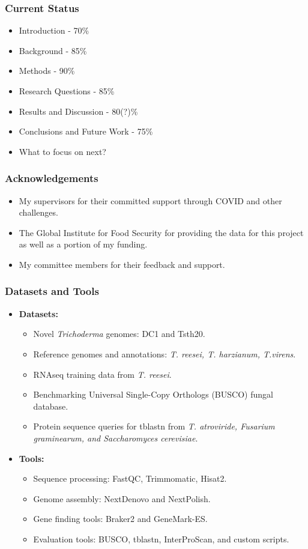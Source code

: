 \documentclass[t]{beamer}
\begin{document}
\begin{frame}
	\frametitle{Current Status}
	\begin{itemize}
		\item Introduction - 70\%
		\item Background - 85\%
		\item Methods - 90\%
		\item Research Questions - 85\%
		\item Results and Discussion - 80(?)\%
		\item Conclusions and Future Work - 75\%
		\item What to focus on next?
	\end{itemize}
\end{frame}

\begin{frame}
	\frametitle{Acknowledgements}
	\begin{itemize}
		\item My supervisors for their committed support through COVID and other challenges.
		\item The Global Institute for Food Security for providing the data for this project as well as a portion of my funding.
		\item My committee members for their feedback and support.
	\end{itemize}
\end{frame}

\begin{frame}
	\frametitle{Datasets and Tools}
	\begin{itemize}
		\item \textbf{Datasets:}
		\begin{itemize}
			\item Novel \textit{Trichoderma} genomes: DC1 and Tsth20.
			\item Reference genomes and annotations: \textit{T. reesei, T. harzianum, T.virens}.
			\item RNAseq training data from \textit{T. reesei}. 
			\item Benchmarking Universal Single-Copy Orthologs (BUSCO) fungal database.
			\item Protein sequence queries for tblastn from \textit{T. atroviride, Fusarium graminearum, and Saccharomyces cerevisiae}.	
		\end{itemize}
		\item \textbf{Tools:}
		\begin{itemize}
			\item Sequence processing: FastQC, Trimmomatic, Hisat2.
			\item Genome assembly: NextDenovo and NextPolish.
			\item Gene finding tools: Braker2 and GeneMark-ES.
			\item Evaluation tools: BUSCO, tblastn, InterProScan, and custom scripts.
		\end{itemize}
	\end{itemize}
\end{frame}
\end{document}
